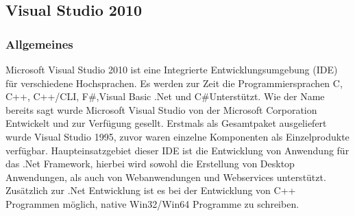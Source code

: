 \subsection{Visual Studio 2010}
\subsubsection{Allgemeines}
Microsoft Visual Studio 2010 ist eine Integrierte Entwicklungsumgebung (IDE) für verschiedene Hochsprachen. Es werden zur Zeit die Programmiersprachen C, C++, C++/CLI, F\#,Visual Basic .Net und C\#Unterstützt.
Wie der Name bereits sagt wurde Microsoft Visual Studio von der Microsoft Corporation Entwickelt und zur Verfügung gesellt. Erstmals als Gesamtpaket ausgeliefert wurde Visual Studio 1995, zuvor waren einzelne Komponenten als Einzelprodukte verfügbar.
Haupteinsatzgebiet dieser IDE ist die Entwicklung von Anwendung für das .Net Framework, hierbei wird sowohl die Erstellung von Desktop Anwendungen, als auch von Webanwendungen und Webservices unterstützt.
Zusätzlich zur .Net Entwicklung ist es bei der Entwicklung von C++ Programmen möglich, native Win32/Win64 Programme zu schreiben. 


